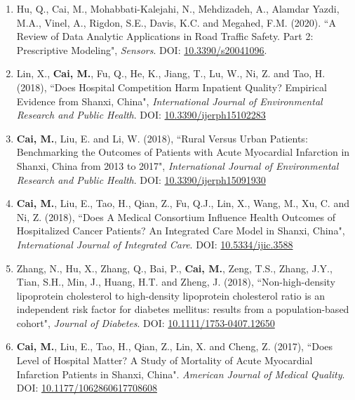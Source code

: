 \documentclass[11pt, a4paper]{article}
\newcommand{\years}[1]{\marginnote{\scriptsize #1}}
\begin{document}
\begin{enumerate}[leftmargin=0ex,itemsep=1ex]
		\item Hu, Q., Cai, M., Mohabbati-Kalejahi, N., Mehdizadeh, A., Alamdar Yazdi, M.A., Vinel, A., Rigdon, S.E., Davis, K.C. and Megahed, F.M. (2020). ``A Review of Data Analytic Applications in Road Traffic Safety. Part 2: Prescriptive Modeling", \emph{Sensors}. DOI: \href{https://doi.org/10.3390/s20041096}{10.3390/s20041096}.
		
		
		\item \years{2018}Lin, X., \textbf{Cai, M.}, Fu, Q., He, K., Jiang, T., Lu, W., Ni, Z. and Tao, H. (2018), ``Does Hospital Competition Harm Inpatient Quality? Empirical Evidence from Shanxi, China", \emph{International Journal of Environmental Research and Public Health}. DOI: \href{https://doi.org/10.3390/ijerph15102283}{10.3390/ijerph15102283}
		
		\item \textbf{Cai, M.}, Liu, E. and Li, W. (2018), ``Rural Versus Urban Patients: Benchmarking the Outcomes of Patients with Acute Myocardial Infarction in Shanxi, China from 2013 to 2017", \emph{International Journal of Environmental Research and Public Health}. DOI: \href{https://doi.org/10.3390/ijerph15091930}{10.3390/ijerph15091930}
		
		\item \textbf{Cai, M.}, Liu, E., Tao, H., Qian, Z., Fu, Q.J., Lin, X., Wang, M., Xu, C. and Ni, Z. (2018), ``Does A Medical Consortium Influence Health Outcomes of Hospitalized Cancer Patients? An Integrated Care Model in Shanxi, China", \emph{International Journal of Integrated Care}. DOI: \href{https://doi.org/10.5334/ijic.3588}{10.5334/ijic.3588}
		
		\item Zhang, N., Hu, X., Zhang, Q., Bai, P., \textbf{Cai, M.}, Zeng, T.S., Zhang, J.Y., Tian, S.H., Min, J., Huang, H.T. and Zheng, J. (2018), ``Non-high-density lipoprotein cholesterol to high-density lipoprotein cholesterol ratio is an independent risk factor for diabetes mellitus: results from a population-based cohort", \emph{Journal of Diabetes}. DOI: \href{https://doi.org/10.1111/1753-0407.12650}{10.1111/1753-0407.12650}
		
		
		\item \years{2017}\textbf{Cai, M.}, Liu, E., Tao, H., Qian, Z., Lin, X. and Cheng, Z. (2017), ``Does Level of Hospital Matter? A Study of Mortality of Acute Myocardial Infarction Patients in Shanxi, China". \emph{American Journal of Medical Quality}. DOI: \href{https://doi.org/10.1177/1062860617708608}{10.1177/1062860617708608}
		

\end{enumerate}
\end{document}

